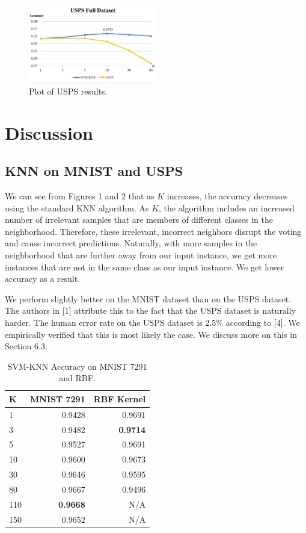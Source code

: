\documentclass[11pt,letterpaper]{article}
\begin{document}
\begin{figure}[t!]
  \centering
  \includegraphics[keepaspectratio, width=0.5\textwidth]{usps_full.png}
  \caption{Plot of USPS results.}
\end{figure}

\section{Discussion}

\subsection{KNN on MNIST and USPS}

We can see from Figures 1 and 2 that as $K$ increases, the accuracy decreases using the standard KNN algorithm. As $K$, the algorithm includes an increased number of irrelevant samples that are members of different classes in the neighborhood. Therefore, these irrelevant, incorrect neighbors disrupt the voting and cause incorrect predictions. Naturally, with more samples in the neighborhood that are further away from our input instance, we get more instances that are not in the same class as our input instance. We get lower accuracy as a result.

We perform slightly better on the MNIST dataset than on the USPS dataset. The authors in [1] attribute this to the fact that the USPS dataset is naturally harder. The human error rate on the USPS dataset is 2.5$\%$ according to [4]. We empirically verified that this is most likely the case. We discuss more on this in Section 6.3.

\begin{table}
\begin{center}
\begin{tabular}{|l|r|r|}
\hline \bf K & \bf MNIST 7291 & \bf RBF Kernel \\ \hline
1 & 0.9428 & 0.9691 \\
3 & 0.9482 & \textbf{0.9714} \\
5 & 0.9527 & 0.9691\\
10 & 0.9600 & 0.9673\\
30 & 0.9646 & 0.9595\\
80 & 0.9667  & 0.9496\\
110 & \textbf{0.9668} & N/A\\
150 & 0.9652 & N/A\\
\hline
\end{tabular}
\end{center}
\caption{\label{knn-mnist} SVM-KNN Accuracy on MNIST 7291 and RBF.}
\end{table}
\end{document}
